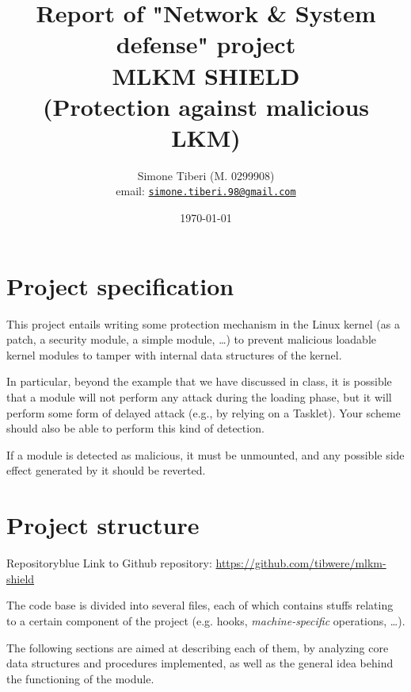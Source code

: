 \documentclass{article}
\title{\small Report of "Network \& System defense" project \\
\Huge \textbf{MLKM SHIELD}\\
\Large (Protection against malicious LKM)}
\author{Simone Tiberi (M. 0299908)\\%
email: \texttt{\href{mailto:simone.tiberi.98@gmail.com}{simone.tiberi.98@gmail.com}}}
\date{\today}
\begin{document}
	\maketitle
	\tableofcontents
	\newpage

	\section{Project specification}
	This project entails writing some protection mechanism in the Linux kernel (as a patch, a security module, a simple
	module, \dots) to prevent malicious loadable kernel modules to tamper with internal data structures of the kernel.

	In particular, beyond the example that we have discussed in class, it is possible that a module will not perform
	any attack during the loading phase, but it will perform some form of delayed attack (e.g., by relying on a
	Tasklet). Your scheme should also be able to perform this kind of detection.

	If a module is detected as malicious, it must be unmounted, and any possible side effect generated by it should be
	reverted.

	\section{Project structure}
	\begin{custombox}{Repository}{blue}
		Link to Github repository: \url{https://github.com/tibwere/mlkm-shield}
	\end{custombox}

	The code base is divided into several files, each of which contains stuffs relating to a certain component of the
	project (e.g. hooks, \textit{machine-specific} operations, \dots).

	The following sections are aimed at describing each of them, by analyzing core data structures and procedures
	implemented, as well as the general idea behind the functioning of the module.
\end{document}
